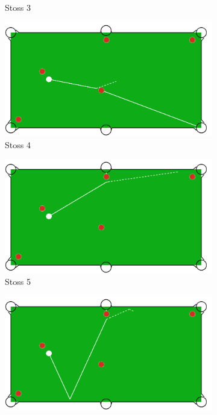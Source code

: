 \begin{figure}[h!]
\begin{subfigure}[b]{0.3\textwidth}
        \caption{Stoss 3}
        \label{fig:situation_rail_1_solution_3}
    \end{subfigure}
    \hfill
    \begin{subfigure}[b]{0.3\textwidth}
        \centering
        \includegraphics[width=1.0\linewidth]{../common/04_results/resources/simple_search/situation_diverse_solution_rail_4.PNG}
        \caption{Stoss 4}
        \label{fig:situation_rail_1_solution_4}
    \end{subfigure}
    \hfill
    \begin{subfigure}[b]{0.3\textwidth}
        \centering
        \includegraphics[width=1.0\linewidth]{../common/04_results/resources/simple_search/situation_diverse_solution_rail_5.PNG}
        \caption{Stoss 5}
        \label{fig:situation_rail_1_solution_5}
    \end{subfigure}
    \hfill
    \begin{subfigure}[b]{0.3\textwidth}
        \centering
        \includegraphics[width=1.0\linewidth]{../common/04_results/resources/simple_search/situation_diverse_solution_rail_6.PNG}

\end{subfigure}
\end{figure}
